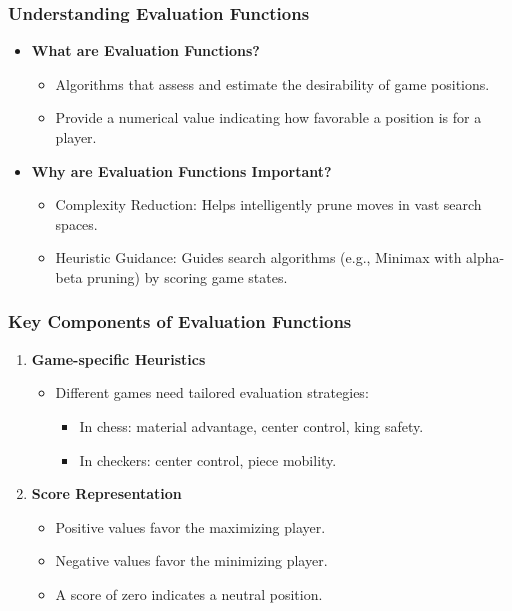 \documentclass[aspectratio=169]{beamer}
\begin{document}
\begin{frame}
  \frametitle{Understanding Evaluation Functions}
  \begin{itemize}
    \item \textbf{What are Evaluation Functions?} 
    \begin{itemize}
      \item Algorithms that assess and estimate the desirability of game positions.
      \item Provide a numerical value indicating how favorable a position is for a player.
    \end{itemize}
    
    \item \textbf{Why are Evaluation Functions Important?}
    \begin{itemize}
      \item Complexity Reduction: Helps intelligently prune moves in vast search spaces.
      \item Heuristic Guidance: Guides search algorithms (e.g., Minimax with alpha-beta pruning) by scoring game states.
    \end{itemize}
  \end{itemize}
\end{frame}

\begin{frame}
  \frametitle{Key Components of Evaluation Functions}
  \begin{enumerate}
    \item \textbf{Game-specific Heuristics}
    \begin{itemize}
      \item Different games need tailored evaluation strategies:
      \begin{itemize}
        \item In chess: material advantage, center control, king safety.
        \item In checkers: center control, piece mobility.
      \end{itemize}
    \end{itemize}

    \item \textbf{Score Representation}
    \begin{itemize}
      \item Positive values favor the maximizing player.
      \item Negative values favor the minimizing player.
      \item A score of zero indicates a neutral position.
    \end{itemize}
  \end{enumerate}
\end{frame}
\end{document}
